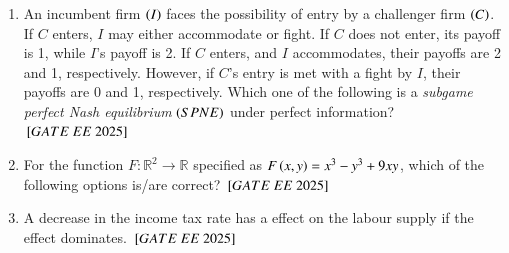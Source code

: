 \documentclass[journal,12pt,onecolumn]{IEEEtran}
\theoremstyle{remark}
\begin{document}
\begin{enumerate}
\item An incumbent firm $\left(I\right)$ faces the possibility of entry by a challenger firm $\left(C\right)$. If $C$ enters, $I$ may either accommodate or fight. If $C$ does not enter, its payoff is 1, while $I$'s payoff is 2. If $C$ enters, and $I$ accommodates, their payoffs are 2 and 1, respectively. However, if $C$'s entry is met with a fight by $I$, their payoffs are 0 and 1, respectively. Which one of the following is a \textit{subgame perfect Nash equilibrium} $\left(SPNE\right)$ under perfect information?
\hfill ${}\left[GATE\ EE\ 2025\right]$
\begin{enumerate}
\end{enumerate}
 
\item For the function $F: \mathbb{R}^2 \to \mathbb{R}$ specified as $F\left(x, y\right) = x^3 - y^3 + 9xy$, which of the following options is/are correct?
\hfill ${}\left[GATE\ EE\ 2025\right]$
\begin{enumerate}
\end{enumerate}
 
\item A decrease in the income tax rate has a \underline{\hspace{1cm}} effect on the labour supply if the \underline{\hspace{1cm}} effect dominates.
\hfill ${}\left[GATE\ EE\ 2025\right]$
\begin{enumerate}
\end{enumerate}
 

\end{enumerate}
\end{document}
